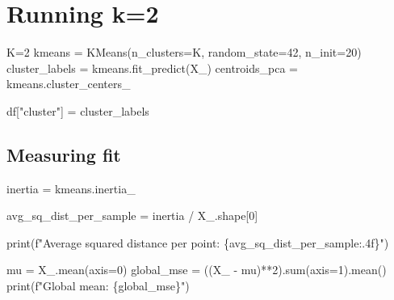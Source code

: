 \documentclass[
  letterpaper,
  DIV=11,
  numbers=noendperiod]{scrreprt}
\newenvironment{Shaded}{\begin{snugshade}}{\end{snugshade}}
\newcommand{\BuiltInTok}[1]{\textcolor[rgb]{0.00,0.23,0.31}{#1}}
\newcommand{\DecValTok}[1]{\textcolor[rgb]{0.68,0.00,0.00}{#1}}
\newcommand{\NormalTok}[1]{\textcolor[rgb]{0.00,0.23,0.31}{#1}}
\newcommand{\OperatorTok}[1]{\textcolor[rgb]{0.37,0.37,0.37}{#1}}
\newcommand{\SpecialCharTok}[1]{\textcolor[rgb]{0.37,0.37,0.37}{#1}}
\newcommand{\SpecialStringTok}[1]{\textcolor[rgb]{0.13,0.47,0.30}{#1}}
\newcommand{\StringTok}[1]{\textcolor[rgb]{0.13,0.47,0.30}{#1}}
\begin{document}
\section{Running k=2}\label{running-k2-1}

\begin{Shaded}
\begin{Highlighting}[]
\NormalTok{K}\OperatorTok{=}\DecValTok{2}
\NormalTok{kmeans }\OperatorTok{=}\NormalTok{ KMeans(n\_clusters}\OperatorTok{=}\NormalTok{K, random\_state}\OperatorTok{=}\DecValTok{42}\NormalTok{, n\_init}\OperatorTok{=}\DecValTok{20}\NormalTok{)}
\NormalTok{cluster\_labels }\OperatorTok{=}\NormalTok{ kmeans.fit\_predict(X\_)}
\NormalTok{centroids\_pca }\OperatorTok{=}\NormalTok{ kmeans.cluster\_centers\_ }
\end{Highlighting}
\end{Shaded}

\begin{Shaded}
\begin{Highlighting}[]
\NormalTok{df[}\StringTok{"cluster"}\NormalTok{] }\OperatorTok{=}\NormalTok{ cluster\_labels}
\end{Highlighting}
\end{Shaded}

\subsection{Measuring fit}\label{measuring-fit}

\begin{Shaded}
\begin{Highlighting}[]
\NormalTok{inertia }\OperatorTok{=}\NormalTok{ kmeans.inertia\_}

\NormalTok{avg\_sq\_dist\_per\_sample }\OperatorTok{=}\NormalTok{ inertia }\OperatorTok{/}\NormalTok{ X\_.shape[}\DecValTok{0}\NormalTok{]}

\BuiltInTok{print}\NormalTok{(}\SpecialStringTok{f"Average squared distance per point: }\SpecialCharTok{\{}\NormalTok{avg\_sq\_dist\_per\_sample}\SpecialCharTok{:.4f\}}\SpecialStringTok{"}\NormalTok{)}

\NormalTok{mu }\OperatorTok{=}\NormalTok{ X\_.mean(axis}\OperatorTok{=}\DecValTok{0}\NormalTok{)}
\NormalTok{global\_mse }\OperatorTok{=}\NormalTok{ ((X\_ }\OperatorTok{{-}}\NormalTok{ mu)}\OperatorTok{**}\DecValTok{2}\NormalTok{).}\BuiltInTok{sum}\NormalTok{(axis}\OperatorTok{=}\DecValTok{1}\NormalTok{).mean()}
\BuiltInTok{print}\NormalTok{(}\SpecialStringTok{f"Global mean: }\SpecialCharTok{\{}\NormalTok{global\_mse}\SpecialCharTok{\}}\SpecialStringTok{"}\NormalTok{)}
\end{Highlighting}
\end{Shaded}
\end{document}

